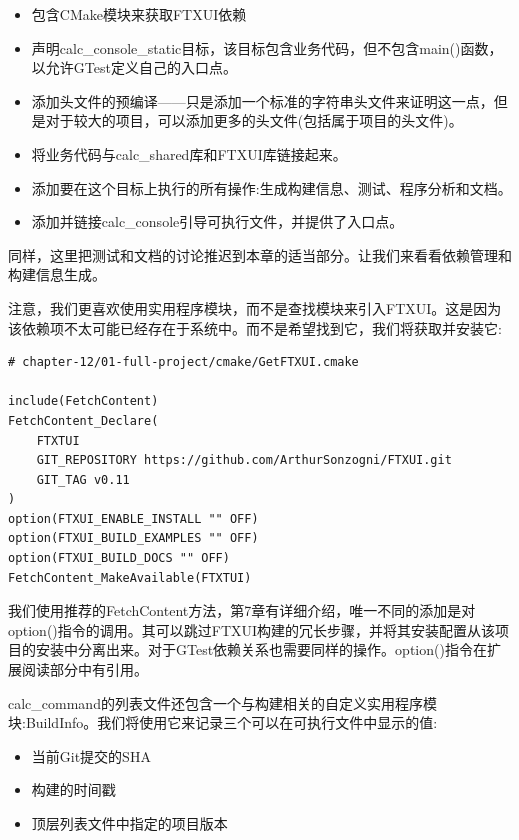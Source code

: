 \begin{itemize}
\item 
包含CMake模块来获取FTXUI依赖

\item 
声明calc\_console\_static目标，该目标包含业务代码，但不包含main()函数，以允许GTest定义自己的入口点。

\item 
添加头文件的预编译——只是添加一个标准的字符串头文件来证明这一点，但是对于较大的项目，可以添加更多的头文件(包括属于项目的头文件)。

\item 
将业务代码与calc\_shared库和FTXUI库链接起来。

\item 
添加要在这个目标上执行的所有操作:生成构建信息、测试、程序分析和文档。

\item 
添加并链接calc\_console引导可执行文件，并提供了入口点。
\end{itemize}

同样，这里把测试和文档的讨论推迟到本章的适当部分。让我们来看看依赖管理和构建信息生成。

注意，我们更喜欢使用实用程序模块，而不是查找模块来引入FTXUI。这是因为该依赖项不太可能已经存在于系统中。而不是希望找到它，我们将获取并安装它:

\begin{lstlisting}[style=styleCMake]
# chapter-12/01-full-project/cmake/GetFTXUI.cmake

include(FetchContent)
FetchContent_Declare(
	FTXTUI
	GIT_REPOSITORY https://github.com/ArthurSonzogni/FTXUI.git
	GIT_TAG v0.11
)
option(FTXUI_ENABLE_INSTALL "" OFF)
option(FTXUI_BUILD_EXAMPLES "" OFF)
option(FTXUI_BUILD_DOCS "" OFF)
FetchContent_MakeAvailable(FTXTUI)
\end{lstlisting}

我们使用推荐的FetchContent方法，第7章有详细介绍，唯一不同的添加是对option()指令的调用。其可以跳过FTXUI构建的冗长步骤，并将其安装配置从该项目的安装中分离出来。对于GTest依赖关系也需要同样的操作。option()指令在扩展阅读部分中有引用。

calc\_command的列表文件还包含一个与构建相关的自定义实用程序模块:BuildInfo。我们将使用它来记录三个可以在可执行文件中显示的值:

\begin{itemize}
\item 
当前Git提交的SHA

\item 
构建的时间戳

\item 
顶层列表文件中指定的项目版本
\end{itemize}

